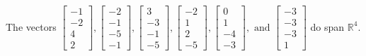 \begin{exercise}
\begin{exerciseStatement}
  \end{exerciseStatement}
  \begin{exerciseAnswer}
   The vectors \(\left[\begin{array}{r}
-1 \\
-2 \\
4 \\
2
\end{array}\right] , \left[\begin{array}{r}
-2 \\
-1 \\
-5 \\
-1
\end{array}\right] , \left[\begin{array}{r}
3 \\
-3 \\
-1 \\
-5
\end{array}\right] , \left[\begin{array}{r}
-2 \\
1 \\
2 \\
-5
\end{array}\right] , \left[\begin{array}{r}
0 \\
1 \\
-4 \\
-3
\end{array}\right] , \text{ and } \left[\begin{array}{r}
-3 \\
-3 \\
-3 \\
1
\end{array}\right]\) 
  	 do  
	span \(\mathbb{R}^4\).
  


  \end{exerciseAnswer}
\end{exercise}